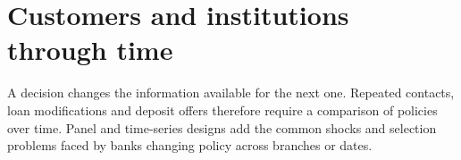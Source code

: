 
\part{Customers and institutions through time}
\label{reading:part-time}
A decision changes the information available for the next one. Repeated
contacts, loan modifications and deposit offers therefore require a comparison
of policies over time. Panel and time-series designs add the common shocks
and selection problems faced by banks changing policy across branches or dates.


